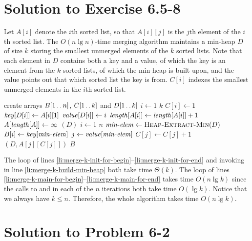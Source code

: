 \documentclass[a4paper, fleqn]{article}
\begin{document}
\section*{Solution to Exercise 6.5-8}

Let $A[i]$ denote the $i$th sorted list, so that $A[i][j]$ is the $j$th element 
of the $i$th sorted list. The $O(n\lg n)$-time merging algorithm maintains a 
min-heap $D$ of size $k$ storing the smallest unmerged elements of the $k$ 
sorted lists. Note that each element in $D$ contains both a key and a value, 
of which the key is an element from the $k$ sorted lists, of which the min-heap 
is built upon, and the value points out that which sorted list the key is from. 
$C[i]$ indexes the smallest unmerged elements in the $i$th sorted list.
\begin{codebox}
\li create arrays $B[1 \mathinner{\ldotp\ldotp} n]$, $C[1 \mathinner{\ldotp\ldotp} k]$ and $D[1 \mathinner{\ldotp\ldotp} k]$
\li \For $i \gets 1$ \To $k$                \label{li:merge-k-init-for-begin}
\li     \Do
            $C[i] \gets 1$
\li         $\id{key}[D[i]] \gets A[i][1]$
\li         $\id{value}[D[i]] \gets i$
\li         $\id{length}[A[i]] \gets \id{length}[A[i]] + 1$
\li         $A[\id{length}[A]] \gets \infty$
        \End                                \label{li:merge-k-init-for-end}
\li {}$(D)$              \label{li:merge-k-build-min-heap}
\li \For $i \gets 1$ \To $n$                \label{li:merge-k-main-for-begin}
\li     \Do
            $\id{min-elem} \gets \proc{Heap-Extract-Min}(D)$
\li         $B[i] \gets \id{key}[\id{min-elem}]$
\li         $j \gets \id{value}[\id{min-elem}]$
\li         $C[j] \gets C[j] + 1$
\li         {}$(D, A[j][C[j]])$
        \End                                \label{li:merge-k-main-for-end}
\li \Return $B$
\end{codebox}
The  loop of lines \ref{li:merge-k-init-for-begin}--\ref{li:merge-k-init-for-end} 
and invoking  in line \ref{li:merge-k-build-min-heap} 
both take time $\Theta(k)$. The  loop of lines \ref{li:merge-k-main-for-begin}--\ref{li:merge-k-main-for-end} 
takes time $O(n\lg k)$ since the calls to  and 
 in each of the $n$ iterations both take time $O(\lg k)$. 
Notice that we always have $k \leq n$. Therefore, the whole algorithm takes time 
$O(n\lg k)$.







\section*{Solution to Problem 6-2}
\end{document}

